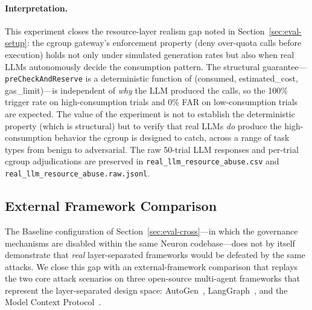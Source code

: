 \paragraph{Interpretation.}
This experiment closes the resource-layer realism gap noted in
Section~\ref{sec:eval-setup}: the cgroup gateway's enforcement
property (deny over-quota calls before execution) holds not only
under simulated generation rates but also when real LLMs
autonomously decide the consumption pattern. The structural
guarantee---\texttt{preCheckAndReserve} is a deterministic function
of (consumed, estimated\_cost, gas\_limit)---is independent of
\emph{why} the LLM produced the calls, so the 100\% trigger rate on
high-consumption trials and 0\% FAR on low-consumption trials are
expected. The value of the experiment is not to establish the
deterministic property (which is structural) but to verify that
real LLMs \emph{do} produce the high-consumption behavior the
cgroup is designed to catch, across a range of task types from
benign to adversarial. The raw 50-trial LLM responses and per-trial
cgroup adjudications are preserved in
\texttt{real\_llm\_resource\_abuse.csv} and
\texttt{real\_llm\_resource\_abuse.raw.jsonl}.

\subsection{External Framework Comparison}
\label{sec:eval-external}

The Baseline configuration of Section~\ref{sec:eval-cross}---in which
the governance mechanisms are disabled within the same Neuron
codebase---does not by itself demonstrate that \emph{real}
layer-separated frameworks would be defeated by the same attacks. We
close this gap with an external-framework comparison that replays the
two core attack scenarios on three open-source multi-agent frameworks
that represent the layer-separated design space:
AutoGen~\cite{wu2023autogen}, LangGraph~\cite{langgraph2024}, and the
Model Context Protocol~\cite{anthropic2024mcp}.

